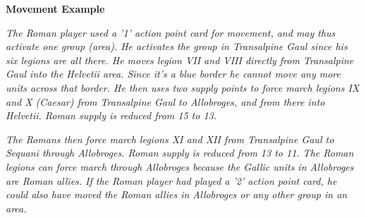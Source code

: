 \textbf{Movement Example}
\par
\textit{The Roman player used a '1' action point card for movement, and may thus activate one group (area). He activates the group in Transalpine Gaul since his six legions are all there. He moves legion VII and VIII directly from Transalpine Gaul into the Helvetii area. Since it's a blue border he cannot move any more units across that border. He then uses two supply points to force march legions IX and X (Caesar) from Transalpine Gaul to Allobroges, and from there into Helvetii. Roman supply is reduced from 15 to 13.}
\par
\textit{The Romans then force march legions XI and XII from Transalpine Gaul to Sequani through Allobroges. Roman supply is reduced from 13 to 11. The Roman legions can force march through Allobroges because the Gallic units in Allobroges are Roman allies. If the Roman player had played a '2' action point card, he could also have moved the Roman allies in Allobroges or any other group in an area.}
